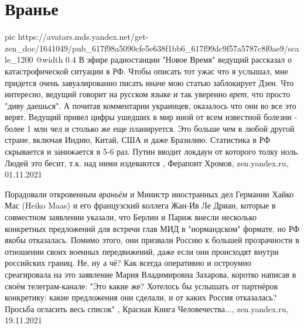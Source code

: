  
 
 
 
 
\chapter{Вранье}
\label{sec:slova.vranje}

\ifcmt
  pic https://avatars.mds.yandex.net/get-zen_doc/1641049/pub_617f98a5090cfe5e638f1bb6_617f99dc9f57a5787c8f0ae9/scale_1200
  @width 0.4
\fi
В эфире радиостанции "Новое Время" ведущий рассказал о катастрофической
ситуации в РФ. Чтобы описать тот ужас что я услышал, мне придется очень
завуалированно писать иначе мою статью заблокирует Дзен.  Что интересно,
ведущий говорит на русском языке и так уверенно \emph{врет}, что просто "диву
даешься". А почитав комментарии украинцев, оказалось что они во все это верят.
Ведущий привел цифры ушедших в мир иной от всем известной болезни - более 1 млн
чел и столько же еще планируется. Это больше чем в любой другой стране, включая
Индию, Китай, США и даже Бразилию.  Статистика в РФ скрывается и занижается в
5-6 раз. Путин вводит локдаун от которого толку ноль. Людей это бесит, т.к. над
ними издеваются
,
Ферапонт Хромов, zen.yandex.ru, 01.11.2021  

Порадовали откровенным \emph{враньём} и Министр иностранных дел Германии Хайко Мас
(Heiko Maas) и его французский коллега Жан-Ив Ле Дриан, которые в совместном
заявлении указали, что Берлин и Париж внесли несколько конкретных предложений
для встречи глав МИД в "нормандском" формате, но РФ якобы отказалась. Помимо
этого, они призвали Россию к большей прозрачности в отношении своих военных
передвижений, даже если они происходят внутри российских границ. Не, ну а чё?
Как всегда оперативно и остроумно среагировала на это заявление Мария
Владимировна Захарова, коротко написав в своём телеграм-канале: "Это какие же?
Хотелось бы услышать от партнёров конкретику: какие предложения они сделали, и
от каких Россия отказалась? Просьба огласить весь список"
, Красная Книга Человечества..., zen.yandex.ru, 19.11.2021
